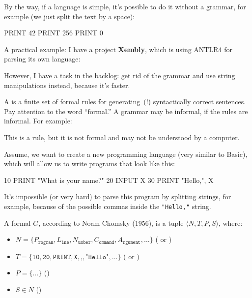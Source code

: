 \documentclass{article}
\begin{document}

\pptToc



By the way, if a language is simple, it's possible to do it without a grammar, for example (we just split the text by a space):
\begin{ffcode}
PRINT 42
PRINT 256
PRINT 0
\end{ffcode}
\plush{}

A practical example: I have a project \textbf{Xembly},
which is using ANTLR4 for parsing its own language:
However, I have a task in the backlog: get rid of the grammar and
use string manipulations instead, because it's faster.
\plush{}

A  is a finite set of formal rules for generating~(!) syntactically correct sentences. Pay attention to the word ``formal.'' A grammar may be informal, if the rules are informal. For example:


This is a rule, but it is not formal and may not be understood by a computer.
\plush{}

Assume, we want to create a new programming language (very similar to Basic), which will allow us to write programs that look like this:
\begin{ffcode}
10 PRINT "What is your name?"
20 INPUT X
30 PRINT "Hello,", X
\end{ffcode}
It's impossible (or very hard) to parse this program by splitting strings, for example, because of the possible commas inside the \texttt{"Hello,"} string.
\plush{}

A formal  $G$, according to Noam Chomsky (1956), is a tuple $\langle N, T, P, S\rangle$, where:
\begin{itemize}
  \item $N = \{ P_\texttt{rogram}, L_\texttt{ine}, N_\texttt{umber},
    C_\texttt{ommand}, A_\texttt{rgument}, \dots \}$ ( or )
  \item $T = \{ \texttt{10}, \texttt{20},
    \texttt{PRINT}, \texttt{X}, \texttt{,}, \texttt{"Hello"}, \dots \}$ ( or )
  \item $P = \{ \dots \}$ ()
  \item $S \in N$ ()
\end{itemize}
\end{document}
